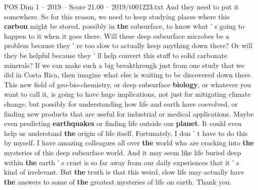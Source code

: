 \begin{textsample}{POS Dim 1 – 2019 – Score 21.00 – 2019/t001223.txt}
And they need to put it somewhere.
So for this reason, we need to keep studying places where this \textbf{carbon} might be stored, possibly in \textbf{the} subsurface, to know what ' s going to happen to it when it goes there.
Will these deep subsurface microbes be a problem because they ' re too slow to actually keep anything down there?
Or will they be helpful because they ' ll help convert this stuff to solid carbonate minerals?
If we can make such a big breakthrough just from one study that we did in Costa Rica, then imagine what else is waiting to be discovered down there.
This new field of geo-bio-chemistry, or deep subsurface \textbf{biology}, or whatever you want to call it, is going to have huge implications, not just for mitigating climate change, but possibly for understanding how life and earth have coevolved, or finding new products that are useful for industrial or medical applications.
Maybe even predicting \textbf{earthquakes} or finding life outside our \textbf{planet}.
It could even help us understand \textbf{the} origin of life itself.
Fortunately, I don ' t have to do this by myself.
I have amazing colleagues all over \textbf{the} world who are cracking into \textbf{the} mysteries of this deep subsurface world.
And it may seem like life buried deep within \textbf{the} earth ' s crust is so far away from our daily experiences that it ' s kind of irrelevant.
But \textbf{the} truth is that this weird, slow life may actually have \textbf{the} answers to some of \textbf{the} greatest mysteries of life on earth.
Thank you.

\end{textsample}
